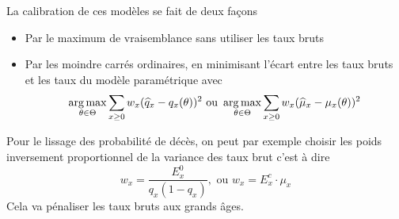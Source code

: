 La calibration de ces modèles se fait de deux façons
\begin{itemize}
  \item Par le maximum de vraisemblance sans utiliser les taux bruts
  \item Par les moindre carrés ordinaires, en minimisant l'écart entre les taux bruts et les taux du modèle paramétrique avec 
  $$
\operatorname*{arg\,max}_{\theta\in\Theta}\sum_{x\geq 0}w_x(\widehat{q}_x - q_x(\theta))^2\text{ ou } \operatorname*{arg\,max}_{\theta\in\Theta}\sum_{x\geq 0}w_x(\widehat{\mu}_x - \mu_x(\theta))^2
  $$
\end{itemize}
\begin{remark}
Pour le lissage des probabilité de décès, on peut par exemple choisir les poids inversement proportionnel de la variance des taux brut c'est à dire 
$$
w_x = \frac{E^0_x}{q_x(1-q_x)},\text{ ou }w_x = E_x^c \cdot\mu_x
$$
Cela va pénaliser les taux bruts aux grands âges.
\end{remark}
